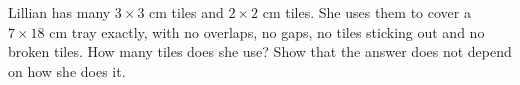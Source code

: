 Lillian has many $3\times3$ cm tiles and $2\times2$ cm tiles. She uses them to cover a $7\times18$ cm tray exactly, with no overlaps, no gaps, no tiles sticking out and no broken tiles. How many tiles does she use? Show that the answer does not depend on how she does it.
